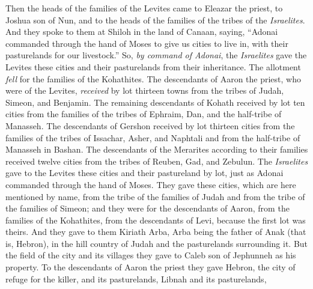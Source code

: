 \begin{biblechapter} %
 Then the heads of the families of the Levites came to Eleazar the priest, to Joshua son of Nun, and to the heads of the families of the tribes of the \textit{Israelites}.
\verse And they spoke to them at Shiloh in the land of Canaan, saying, “Adonai commanded through the hand of Moses to give us cities to live in, with their pasturelands for our livestock.”
\verse So, \textit{by command of Adonai}, the \textit{Israelites} gave the Levites these cities and their pasturelands from their inheritance.
\verse The allotment \textit{fell} for the families of the Kohathites. The descendants of Aaron the priest, who were of the Levites, \textit{received} by lot thirteen towns from the tribes of Judah, Simeon, and Benjamin.
\verse The remaining descendants of Kohath received by lot ten cities from the families of the tribes of Ephraim, Dan, and the half-tribe of Manasseh.
\verse The descendants of Gershon received by lot thirteen cities from the families of the tribes of Issachar, Asher, and Naphtali and from the half-tribe of Manasseh in Bashan.
\verse The descendants of the Merarites according to their families received twelve cities from the tribes of Reuben, Gad, and Zebulun.
\verse The \textit{Israelites} gave to the Levites these cities and their pastureland by lot, just as Adonai commanded through the hand of Moses.
\verse They gave these cities, which are here mentioned by name, from the tribe of the families of Judah and from the tribe of the families of Simeon;
\verse and they were for the descendants of Aaron, from the families of the Kohathites, from the descendants of Levi, because the first lot was theirs.
\verse And they gave to them Kiriath Arba, Arba being the father of Anak (that is, Hebron), in the hill country of Judah and the pasturelands surrounding it.
\verse But the field of the city and its villages they gave to Caleb son of Jephunneh as his property.
\verse To the descendants of Aaron the priest they gave Hebron, the city of refuge for the killer, and its pasturelands, Libnah and its pasturelands,

\end{biblechapter}

